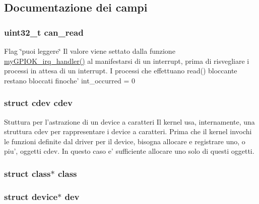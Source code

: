 \subsection{Documentazione dei campi}
\hypertarget{structmy_g_p_i_o_k__t_a2b8d3d6037e2d2fdadbd7c2fd995f0a1}{
\subsubsection[{can\+\_\+read}]{\setlength{\rightskip}{0pt plus 5cm}uint32\+\_\+t can\+\_\+read}}\label{structmy_g_p_i_o_k__t_a2b8d3d6037e2d2fdadbd7c2fd995f0a1}
Flag \char`\"{}puoi leggere\char`\"{} Il valore viene settato dalla funzione \hyperlink{group___linux-_driver_ga2fc230a12a97aa63e43b2dc4aec73511}{my\+G\+P\+I\+O\+K\+\_\+irq\+\_\+handler()} al manifestarsi di un interrupt, prima di risvegliare i processi in attesa di un interrupt. I processi che effettuano read() bloccante restano bloccati finoche' int\+\_\+occurred = 0 \hypertarget{structmy_g_p_i_o_k__t_acba682fe45d5a1501790dbdb1d99bd6a}{
\subsubsection[{cdev}]{\setlength{\rightskip}{0pt plus 5cm}struct cdev cdev}}\label{structmy_g_p_i_o_k__t_acba682fe45d5a1501790dbdb1d99bd6a}
Stuttura per l'astrazione di un device a caratteri Il kernel usa, internamente, una struttura cdev per rappresentare i device a caratteri. Prima che il kernel invochi le funzioni definite dal driver per il device, bisogna allocare e registrare uno, o piu', oggetti cdev. In questo caso e' sufficiente allocare uno solo di questi oggetti. \hypertarget{structmy_g_p_i_o_k__t_a9b6474dd18270738a5c4853fd93b5e70}{
\subsubsection[{class}]{\setlength{\rightskip}{0pt plus 5cm}struct class$\ast$ class}}\label{structmy_g_p_i_o_k__t_a9b6474dd18270738a5c4853fd93b5e70}
\hypertarget{structmy_g_p_i_o_k__t_acf6a82c73e7a9d99293d9ce0b8837faf}{
\subsubsection[{dev}]{\setlength{\rightskip}{0pt plus 5cm}struct device$\ast$ dev}}\label{structmy_g_p_i_o_k__t_acf6a82c73e7a9d99293d9ce0b8837faf}
